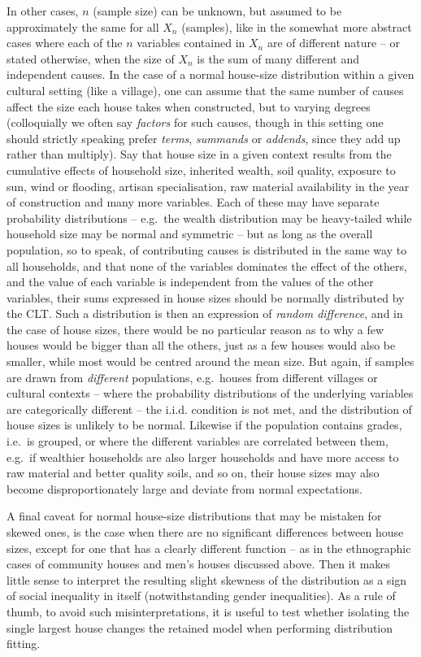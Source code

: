 \documentclass[
  12pt,
]{book}
\begin{document}
In other cases, \(n\) (sample size) can be unknown, but assumed to be approximately the same for all \(X_n\) (samples), like in the somewhat more abstract cases where each of the \(n\) variables contained in \(X_n\) are of different nature -- or stated otherwise, when the size of \(X_n\) is the sum of many different and independent causes. In the case of a normal house-size distribution within a given cultural setting (like a village), one can assume that the same number of causes affect the size each house takes when constructed, but to varying degrees (colloquially we often say \emph{factors} for such causes, though in this setting one should strictly speaking prefer \emph{terms}, \emph{summands} or \emph{addends}, since they add up rather than multiply). Say that house size in a given context results from the cumulative effects of household size, inherited wealth, soil quality, exposure to sun, wind or flooding, artisan specialisation, raw material availability in the year of construction and many more variables. Each of these may have separate probability distributions -- e.g.~the wealth distribution may be heavy-tailed while household size may be normal and symmetric -- but as long as the overall population, so to speak, of contributing causes is distributed in the same way to all households, and that none of the variables dominates the effect of the others, and the value of each variable is independent from the values of the other variables, their sums expressed in house sizes should be normally distributed by the CLT. Such a distribution is then an expression of \emph{random difference}, and in the case of house sizes, there would be no particular reason as to why a few houses would be bigger than all the others, just as a few houses would also be smaller, while most would be centred around the mean size. But again, if samples are drawn from \emph{different} populations, e.g.~houses from different villages or cultural contexts -- where the probability distributions of the underlying variables are categorically different -- the i.i.d. condition is not met, and the distribution of house sizes is unlikely to be normal. Likewise if the population contains grades, i.e.~is grouped, or where the different variables are correlated between them, e.g.~if wealthier households are also larger households and have more access to raw material and better quality soils, and so on, their house sizes may also become disproportionately large and deviate from normal expectations.

A final caveat for normal house-size distributions that may be mistaken for skewed ones, is the case when there are no significant differences between house sizes, except for one that has a clearly different function -- as in the ethnographic cases of community houses and men's houses discussed above. Then it makes little sense to interpret the resulting slight skewness of the distribution as a sign of social inequality in itself (notwithstanding gender inequalities). As a rule of thumb, to avoid such misinterpretations, it is useful to test whether isolating the single largest house changes the retained model when performing distribution fitting.
\end{document}
